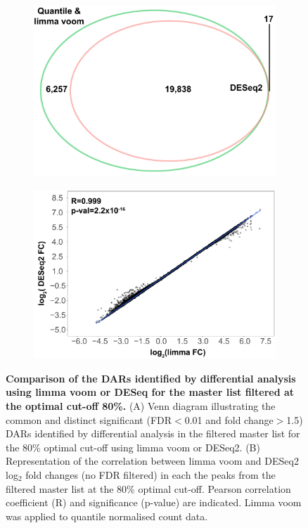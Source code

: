 \begin{figure}[htbp]
\centering
\begin{subfigure}{0.5\textwidth}
\centering
\includegraphics[width=\textwidth]{./Results1/pdfs/ATAC_Core_fresh_CD4vsCD14_venn_diagram_differential_analysis_FDR_01_quantile_DESeq2_only}
\caption{\textbf{}}
\end{subfigure}
\begin{subfigure}{0.5\textwidth}
\centering
\includegraphics[width=\textwidth]{./Results1/pdfs/ATAC_Core_fastq_CD4_CD14_80pcnt_cut_off_correlation_log2FC_quantile_vs_deseq2}
\caption{\textbf{}} %
\end{subfigure}
\caption[Comparison of the DARs identified by differential analysis using limma voom or DESeq for the master list filtered at the optimal cut-off 80\%.]{\textbf{Comparison of the DARs identified by differential analysis using limma voom or DESeq for the master list filtered at the optimal cut-off 80\%.} (A) Venn diagram illustrating the common and distinct significant (FDR$<$0.01 and fold change$>$1.5) DARs identified by differential analysis in the filtered master list for the 80\% optimal cut-off using limma voom or DESeq2. (B) Representation of the correlation between limma voom and DESeq2 log$_2$ fold changes (no FDR filtered) in each the peaks from the filtered master list at the 80\% optimal cut-off. Pearson correlation coefficient (R) and significance (p-value) are indicated. Limma voom was applied to quantile normalised count data.}

\end{figure}
